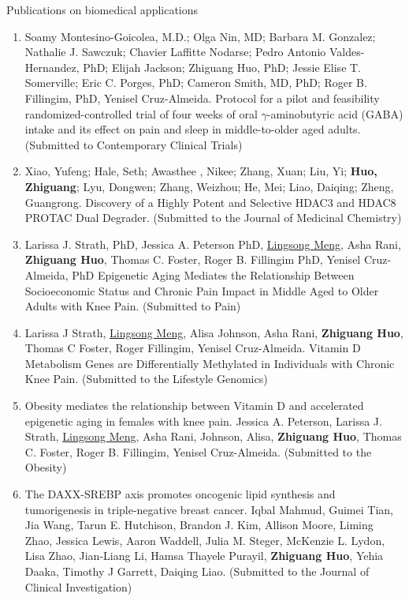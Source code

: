 \documentclass{resume} %
\begin{document}
\begin{rSection}{Publications on biomedical applications}
\begin{enumerate}[noitemsep,topsep=0pt]
\item Soamy Montesino-Goicolea, M.D.; Olga Nin, MD; Barbara M. Gonzalez; Nathalie J. Sawczuk; Chavier Laffitte Nodarse; Pedro Antonio Valdes-Hernandez, PhD; Elijah Jackson; Zhiguang Huo, PhD; Jessie Elise T. Somerville; Eric C. Porges, PhD; Cameron Smith, MD, PhD; Roger B. Fillingim, PhD, Yenisel Cruz-Almeida.
Protocol for a pilot and feasibility randomized-controlled trial of four weeks of oral $\gamma$-aminobutyric acid (GABA) intake and its effect on pain and sleep in middle-to-older aged adults.
(Submitted to Contemporary Clinical Trials)

\item Xiao, Yufeng; Hale, Seth; Awasthee , Nikee; Zhang, Xuan; Liu, Yi; {\bf Huo, Zhiguang}; Lyu, Dongwen; Zhang, Weizhou; He, Mei; Liao, Daiqing; Zheng, Guangrong.
Discovery of a Highly Potent and Selective HDAC3 and HDAC8 PROTAC Dual Degrader.
(Submitted to the Journal of Medicinal Chemistry)

\item 
Larissa J. Strath, PhD, Jessica A. Peterson PhD, \underline{Lingsong Meng}, Asha Rani, {\bf Zhiguang Huo}, Thomas C. Foster, Roger B. Fillingim PhD, Yenisel Cruz-Almeida, PhD
Epigenetic Aging Mediates the Relationship Between Socioeconomic Status and Chronic Pain Impact in Middle Aged to Older Adults with Knee Pain. 
(Submitted to Pain)

\item 
Larissa J Strath, \underline{Lingsong Meng}, Alisa Johnson, Asha Rani, {\bf Zhiguang Huo}, Thomas C Foster, Roger Fillingim, Yenisel Cruz-Almeida. 
Vitamin D Metabolism Genes are Differentially Methylated in Individuals with Chronic Knee Pain.
(Submitted to the Lifestyle Genomics)

\item 
Obesity mediates the relationship between Vitamin D and accelerated epigenetic aging in females with knee pain.
Jessica A. Peterson, Larissa J. Strath,  \underline{Lingsong Meng}, Asha Rani, Johnson, Alisa,  {\bf Zhiguang Huo}, Thomas C. Foster, Roger B. Fillingim, Yenisel Cruz-Almeida. 
(Submitted to the Obesity)

\item
The DAXX-SREBP axis promotes oncogenic lipid synthesis and tumorigenesis in triple-negative breast cancer.
Iqbal Mahmud, Guimei Tian, Jia Wang, Tarun E. Hutchison, Brandon J. Kim, Allison Moore, Liming Zhao, Jessica Lewis, Aaron Waddell, Julia M. Steger, McKenzie L. Lydon, Lisa Zhao, Jian-Liang Li, Hamsa Thayele Purayil, {\bf Zhiguang Huo}, Yehia Daaka, Timothy J Garrett, Daiqing Liao.
(Submitted to the Journal of Clinical Investigation)


\end{enumerate}
\end{rSection}
\end{document}
